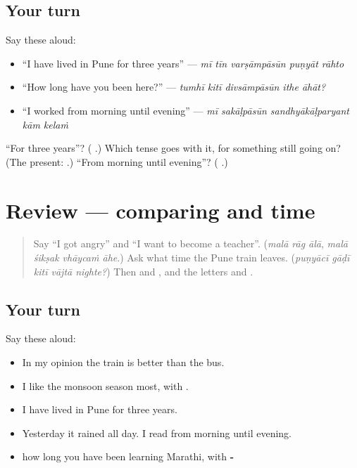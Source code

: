 \subsection*{Your turn}
Say these aloud:

\begin{itemize}
\raggedright
  \item \textquotedblleft{}I have lived in Pune for three years\textquotedblright{} — \emph{mī tīn varṣāmpāsūn puṇyāt rāhto}
  \item \textquotedblleft{}How long have you been here?\textquotedblright{} — \emph{tumhī kitī divsāmpāsūn ithe āhāt?}
  \item \textquotedblleft{}I worked from morning until evening\textquotedblright{} — \emph{mī sakāḷpāsūn sandhyākāḷparyant kām kelaṁ}
\end{itemize}

\begin{tcolorbox}[breakable,colback=teal!4,colframe=teal!35!black,title={Before you move on}]
\textquotedblleft{}For three years\textquotedblright{}? (\textbf{ }.) Which tense goes with it, for something still going on? (The present: \textbf{}.) \textquotedblleft{}From morning until evening\textquotedblright{}? (\textbf{ }.)
\end{tcolorbox}
\section[(review)]{Review — comparing and time}

\label{lesson:MR-R285-comparing-and-time}



\begin{quote}
Say \textquotedblleft{}I got angry\textquotedblright{} and \textquotedblleft{}I want to become a teacher\textquotedblright{}. (\emph{malā rāg ālā}, \emph{malā śikṣak vhāycaṁ āhe}.) Ask what time the Pune train leaves. (\emph{puṇyācī gāḍī kitī vājtā nighte?}) Then \textbf{} and \textbf{}, and the letters \textbf{} and \textbf{}.
\end{quote}

\subsection*{Your turn}
Say these aloud:

\begin{itemize}
\raggedright
  \item In my opinion the train is better than the bus.
  \item I like the monsoon season most, with \textbf{}.
  \item I have lived in Pune for three years.
  \item Yesterday it rained all day. I read from morning until evening.
  \item how long you have been learning Marathi, with \textbf{-}
\end{itemize}

